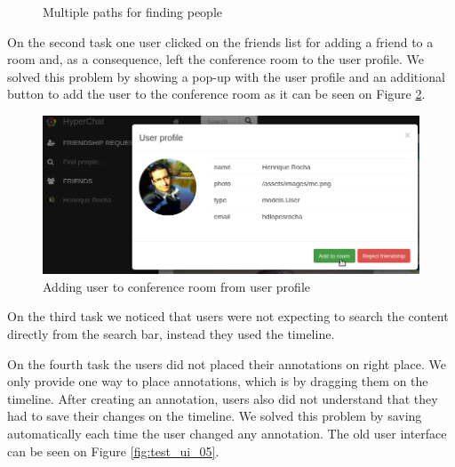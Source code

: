 \begin{figure}
    \caption{Multiple paths for finding people}
    \label{fig:test_ui_01_02_03}
\end{figure}

On the second task one user clicked on the friends list for adding a friend to a room and, as a consequence, left the conference room to the user profile. We solved this problem by showing a pop-up with the user profile and an additional button to add the user to the conference room as it can be seen on Figure \ref{fig:test_ui_04}.

\begin{figure}
\centering
\begin{minipage}[b]{0.7\linewidth}
\centering

    \includegraphics[width=\textwidth]{figures/test_ui_04.png}
\end{minipage}


    \caption{Adding user to conference room from user profile}
    \label{fig:test_ui_04}
\end{figure}

On the third task we noticed that users were not expecting to search the content directly from the search bar, instead they used the timeline.

On the fourth task the users did not placed their annotations on right place. We only provide one way to place annotations, which is by dragging them on the timeline. 
After creating an annotation, users also did not understand that they had to save their changes on the timeline. We solved this problem by saving automatically each time the user changed any annotation. The old user interface can be seen on Figure \ref{fig:test_ui_05}.

